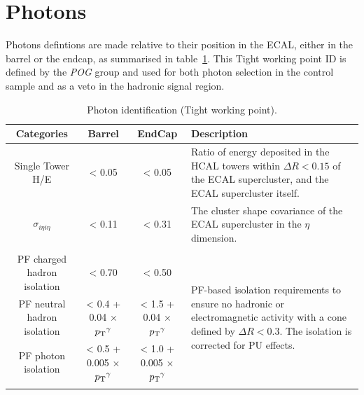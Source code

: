 \section{Photons}  %
\label{sec:objects_photons}

Photons defintions are made relative to their position in the ECAL,
either
in the barrel or the endcap, as summarised in table~\ref{tab:photon-id-egamma}. 
This Tight working point ID is defined by the \emph{POG} group
\cite{ref:photonidtwiki} and used for both photon
selection in the \gj control sample and as a veto in the hadronic signal region.

\begin{table}[ht!]
  \caption{Photon identification (Tight working point).\label{tab:photon-id-egamma}}
  \centering
  \scriptsize
  \begin{tabular}{ cccp{4cm} }
    \hline
    \hline
    Categories                    & Barrel                             & EndCap 
    & Description                         \\
    \hline
    Single Tower H/E              & < 0.05                               & < 0.05                               
    & Ratio of energy deposited in the HCAL towers within $\Delta R<0.15$ of the ECAL 
    supercluster, and the ECAL supercluster itself. \\
    $\sigma_{i\eta i\eta}$        & < 0.11                               & < 0.31 & 
    The cluster shape covariance of the ECAL supercluster in the $\eta$
    dimension. \\
    &&&\multirow{5}{4cm}{PF-based isolation requirements to ensure no hadronic or electromagnetic 
    activity with a cone defined by $\Delta R < 0.3$. The isolation is
    corrected for PU effects.}\\
    PF charged hadron isolation   & < 0.70                               & < 0.50                               & \\
    PF neutral hadron isolation   & < 0.4 + 0.04 $\times$ ${p_{\text T}}^{\gamma}$  & < 1.5 + 0.04 $\times$ ${p_{\text T}}^{\gamma}$&
    \\
    PF photon isolation           & < 0.5 + 0.005 $\times$ ${p_{\text T}}^{\gamma}$ & < 1.0 + 0.005 $\times$ ${p_{\text T}}^{\gamma}$& \\
    \\
    \hline
    \hline
  \end{tabular}
\end{table}

